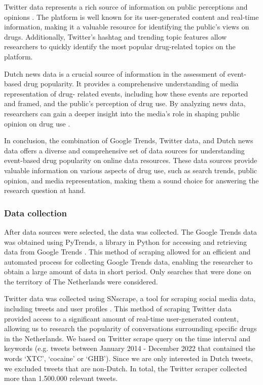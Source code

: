 Twitter data represents a rich source of information on public
perceptions and opinions \cite{bian}. The platform is well known
for its user-generated content and real-time information, making
it a valuable resource for identifying the public's views on
drugs. Additionally, Twitter's hashtag and trending topic
features allow researchers to quickly identify the most popular
drug-related topics on the platform.

Dutch news data is a crucial source of information in the
assessment of event-based drug popularity. It provides a
comprehensive understanding of media representation of drug-
related events, including how these events are reported and
framed, and the public's perception of drug use. By analyzing
news data, researchers can gain a deeper insight into the
media's role in shaping public opinion on drug use \cite{mccombs}.

In conclusion, the combination of Google Trends, Twitter data, 
and Dutch news data offers a diverse and comprehensive set of 
data sources for understanding event-based drug popularity on
online data resources. These data sources provide valuable 
information on various aspects of drug use, such as search
trends, public opinion, and media representation, making them a
sound choice for answering the research question at hand.

\subsubsection{Data collection}

After data sources were selected, the data  was collected. The
Google Trends data was obtained using PyTrends, a library in
Python for accessing and retrieving data from Google Trends
\cite{PyPI}. This method of scraping allowed for an efficient
and automated process for collecting Google Trends data,
enabling the researcher to obtain a large amount of data in
short period. Only searches that were done on the territory of
The Netherlands were considered.

Twitter data was collected using SNscrape, a tool for scraping
social media data, including tweets and user profiles
\cite{GitHub}. This method of scraping Twitter data provided
access to a significant amount of real-time user-generated
content, allowing us to research the popularity of conversations
surrounding specific drugs in the Netherlands. We based on
Twitter scrape query on the time interval and keywords (e.g.
tweets between January 2014 - December 2022 that contained the
words ‘XTC’, ‘cocaine’ or ‘GHB’). Since we are only interested
in Dutch tweets, we excluded tweets that are non-Dutch. In
total, the Twitter scraper collected more than 1.500.000
relevant tweets.

